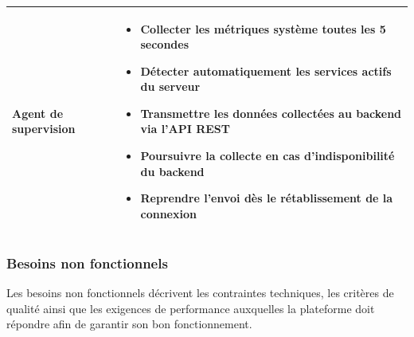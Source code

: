 \begin{longtable}{|>{\raggedright\arraybackslash}p{3.8cm}
                  |>{\raggedright\arraybackslash}p{10.4cm}|}
Agent de supervision &
\begin{itemize}[label=--, leftmargin=*, nosep, topsep=2pt]
  \item Collecter les métriques système toutes les 5 secondes
  \item Détecter automatiquement les services actifs du serveur
  \item Transmettre les données collectées au backend via l'API REST
  \item Poursuivre la collecte en cas d'indisponibilité du backend
  \item Reprendre l'envoi dès le rétablissement de la connexion
\end{itemize} \\
\hline

\end{longtable}

\subsubsection*{Besoins non fonctionnels}
Les besoins non fonctionnels décrivent les contraintes techniques, les critères de
qualité ainsi que les exigences de performance auxquelles la plateforme doit répondre
afin de garantir son bon fonctionnement.

